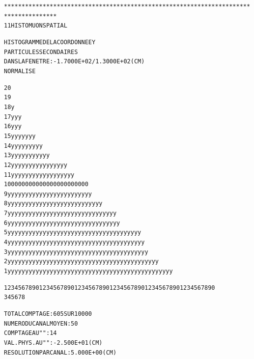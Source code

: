 \begin{alltt}






*************************************************************************************
   11  HISTO     MUON      SPATIAL 

                            HISTOGRAMME  DE  LA  COORDONNEE  Y    
                            PARTICULES  SECONDAIRES               
                            DANS  LA  FENETRE :  -1.7000E+02 /   1.3000E+02 (CM) 
                            NORMALISE     

 20                                                                            
 19                                                                            
 18                                          y                                 
 17                                          y        yy                            
 16                                          y        yy                            
 15                                      y   y y     yyy   y                        
 14                                      y   y y  y  yyyy  y                        
 13                                      y   yyy  yy yyyy  y                        
 12                                     yy y yyy yyy yyyyy y    y                   
 11                                    yyy y yyy yyy yyyyy y    y   y               
 10                                    000 0 000 000000000000   0   00              
  9                                    yyyyy yyy yyyyyyyyyyyy y y   yy              
  8                                   yyyyyyyyyy yyyyyyyyyyyyyy y   yy              
  7                                 yyyyyyyyyyyyyyyyyyyyyyyyyyy y  yyy              
  6                                 yyyyyyyyyyyyyyyyyyyyyyyyyyy y yyyy              
  5                              y  yyyyyyyyyyyyyyyyyyyyyyyyyyyyyyyyyy yyy          
  4                              y  yyyyyyyyyyyyyyyyyyyyyyyyyyyyyyyyyyyyyy          
  3                              y  yyyyyyyyyyyyyyyyyyyyyyyyyyyyyyyyyyyyyyy         
  2                             yy   yy  yyyyyyyyyyyyyyyyyyyyyyyyyyyyyyyyyyyyyyy         
  1                             yy  yyyyyyyyyyyyyyyyyyyyyyyyyyyyyyyyyyyyyyyyyyyyy        

                         123456789012345678901234567890123456789012345678901234567890
                                3         4         5         6         7         8


                TOTAL  COMPTAGE                 :     605  SUR  10000
                NUMERO   DU  CANAL  MOYEN       :      50
                COMPTAGE  AU   "      "         :      14
                VAL. PHYS. AU  "      "         : -2.500E+01 (CM) 
                RESOLUTION  PAR  CANAL          :  5.000E+00 (CM) 


\end{alltt}
